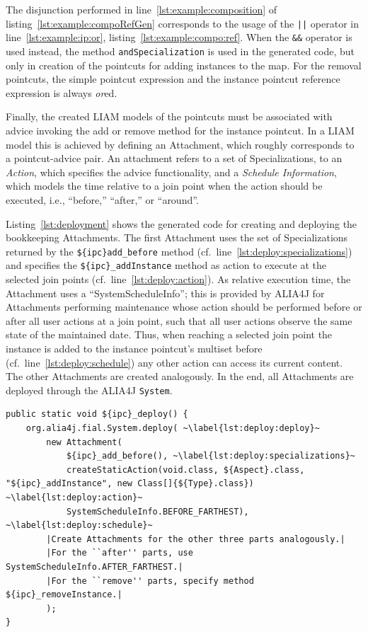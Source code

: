 \documentclass{acm_proc_article-sp}
\begin{document}
The disjunction performed in line~\ref{lst:example:composition} of listing~\ref{lst:example:compoRefGen} corresponds to the usage of the \lstinline{||} operator in line~\ref{lst:example:ip:or}, listing~\ref{lst:example:compo:ref}.
When the \lstinline{&&} operator is used instead, the method \lstinline{andSpecialization} is used in the generated code, but only in creation of the pointcuts for adding instances to the map. For the removal pointcuts, the simple pointcut expression and the instance pointcut reference expression is always \emph{or}ed.

Finally, the created LIAM models of the pointcuts must be associated with advice invoking the add or remove method for the instance pointcut.
In a LIAM model this is achieved by defining an Attachment, which roughly corresponds to a pointcut-advice pair.
An attachment refers to a set of Specializations, to an \emph{Action}, which specifies the advice functionality, and a \emph{Schedule Information}, which models the time relative to a join point when the action should be executed, i.e., ``before,'' ``after,'' or ``around''.

Listing~\ref{lst:deployment} shows the generated code for creating and deploying the bookkeeping Attachments.
The first Attachment uses the set of Specializations returned by the \lstinline!${ipc}add_before! method (cf.\ line~\ref{lst:deploy:specializations}) and specifies the \lstinline!${ipc}_addInstance! method as action to execute at the selected join points (cf.\ line~\ref{lst:deploy:action}).
As relative execution time, the Attachment uses a ``SystemScheduleInfo''; this is provided by ALIA4J for Attachments performing maintenance whose action should be performed before or after all user actions at a join point, such that all user actions observe the same state of the maintained date.
Thus, when reaching a selected join point the instance is added to the instance pointcut's multiset before (cf.\ line~\ref{lst:deploy:schedule}) any other action can access its current content.
The other Attachments are created analogously.
In the end, all Attachments are deployed through the ALIA4J \lstinline{System}.

\begin{lstlisting}[caption={Deployment of the bookkeeping for an instance pointcut.},label=lst:deployment]
public static void ${ipc}_deploy() {
	org.alia4j.fial.System.deploy( ~\label{lst:deploy:deploy}~
		new Attachment(
			${ipc}_add_before(), ~\label{lst:deploy:specializations}~
			createStaticAction(void.class, ${Aspect}.class, "${ipc}_addInstance", new Class[]{${Type}.class}) ~\label{lst:deploy:action}~
			SystemScheduleInfo.BEFORE_FARTHEST), ~\label{lst:deploy:schedule}~
		|Create Attachments for the other three parts analogously.|
		|For the ``after'' parts, use SystemScheduleInfo.AFTER_FARTHEST.|
		|For the ``remove'' parts, specify method ${ipc}_removeInstance.|
		);
}
\end{lstlisting}
\end{document}
